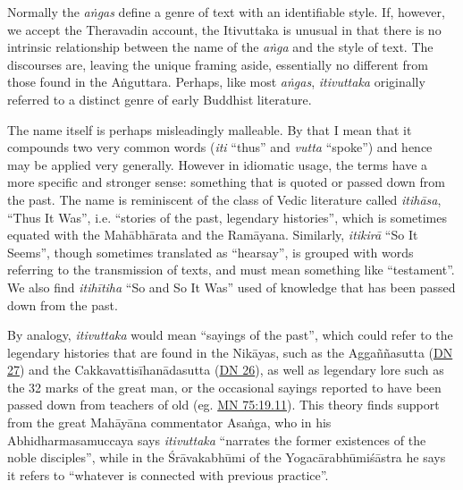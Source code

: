 \documentclass[12pt,openany]{book}%
\begin{document}
Normally the \emph{\textsanskrit{aṅgas}} define a genre of text with an identifiable style. If, however, we accept the Theravadin account, the Itivuttaka is unusual in that there is no intrinsic relationship between the name of the \emph{\textsanskrit{aṅga}} and the style of text. The discourses are, leaving the unique framing aside, essentially no different from those found in the \textsanskrit{Aṅguttara}. Perhaps, like most \emph{\textsanskrit{aṅgas}}, \emph{itivuttaka} originally referred to a distinct genre of early Buddhist literature.

The name itself is perhaps misleadingly malleable. By that I mean that it compounds two very common words (\emph{iti} “thus” and \emph{vutta} “spoke”) and hence may be applied very generally. However in idiomatic usage, the terms have a more specific and stronger sense: something that is quoted or passed down from the past. The name is reminiscent of the class of Vedic literature called \emph{\textsanskrit{itihāsa}}, “Thus It Was”, i.e. “stories of the past, legendary histories”, which is sometimes equated with the \textsanskrit{Mahābhārata} and the \textsanskrit{Ramāyana}. Similarly, \emph{\textsanskrit{itikirā}} “So It Seems”, though sometimes translated as “hearsay”, is grouped with words referring to the transmission of texts, and must mean something like “testament”. We also find \emph{\textsanskrit{itihītiha}} “So and So It Was” used of knowledge that has been passed down from the past.

By analogy, \emph{itivuttaka} would mean “sayings of the past”, which could refer to the legendary histories that are found in the \textsanskrit{Nikāyas}, such as the \textsanskrit{Aggaññasutta} (\href{https://suttacentral.net/dn27/en/sujato}{DN 27}) and the \textsanskrit{Cakkavattisīhanādasutta} (\href{https://suttacentral.net/dn26/en/sujato}{DN 26}), as well as legendary lore such as the 32 marks of the great man, or the occasional sayings reported to have been passed down from teachers of old (eg. \href{https://suttacentral.net/mn75/en/sujato\#19.11}{MN 75:19.11}). This theory finds support from the great \textsanskrit{Mahāyāna} commentator \textsanskrit{Asaṅga}, who in his Abhidharmasamuccaya says \emph{itivuttaka} “narrates the former existences of the noble disciples”, while in the \textsanskrit{Śrāvakabhūmi} of the \textsanskrit{Yogacārabhūmiśāstra} he says it refers to “whatever is connected with previous practice”.
\end{document}
